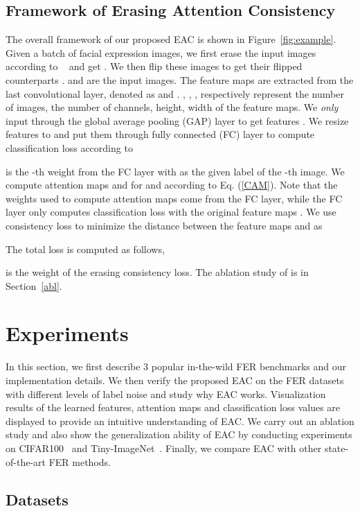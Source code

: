 \documentclass[runningheads]{llncs}
\begin{document}
\subsection{Framework of Erasing Attention Consistency}
The overall framework of our proposed EAC is shown in Figure~\ref{fig:example}. Given a batch of facial expression images, we first erase the input images according to ~\cite{zhong2020random} and get . We then flip these images to get their flipped counterparts .  and  are the input images. The feature maps are extracted from the last convolutional layer, denoted as  and . , , ,  respectively represent the number of images, the number of channels, height, width of the feature maps. We \emph{only} input  through the global average pooling (GAP) layer to get features . We resize features  to  and put them through fully connected (FC) layer to compute classification loss according to


 is the -th weight from the FC layer with  as the given label of the -th image.
We compute attention maps  and  for  and  according to Eq. (\ref{CAM}). Note that the weights used to compute attention maps come from the FC layer, while the FC layer only computes classification loss with the original feature maps . We use consistency loss to minimize the distance between the feature maps  and  as 
 
 The total loss is computed as follows,

  is the weight of the erasing consistency loss. The ablation study of  is in Section~\ref{abl}.

\section{Experiments}
In this section, we first describe 3 popular in-the-wild FER benchmarks and our implementation details. We then verify the proposed EAC on the FER datasets with different levels of label noise and study why EAC works. Visualization results of the learned features, attention maps and classification loss values are displayed to provide an intuitive understanding of EAC. We carry out an ablation study and also show the generalization ability of EAC by conducting experiments on CIFAR100~\cite{krizhevsky2009learning} and Tiny-ImageNet~\cite{russakovsky2015imagenet}. Finally, we compare EAC with other state-of-the-art FER methods.

\subsection{Datasets}
\end{document}
